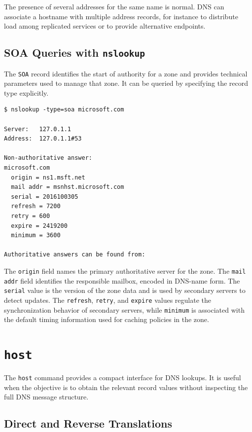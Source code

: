 \documentclass{scrbook}
\begin{document}
	The presence of several addresses for the same name is normal. DNS can associate a hostname with multiple address records, for instance to distribute load among replicated services or to provide alternative endpoints.
	
	\subsection{SOA Queries with \texttt{nslookup}}
	
	The \texttt{SOA} record identifies the start of authority for a zone and provides technical parameters used to manage that zone. It can be queried by specifying the record type explicitly.
	
	\begin{lstlisting}
$ nslookup -type=soa microsoft.com

Server:   127.0.1.1
Address:  127.0.1.1#53

Non-authoritative answer:
microsoft.com
  origin = ns1.msft.net
  mail addr = msnhst.microsoft.com
  serial = 2016100305
  refresh = 7200
  retry = 600
  expire = 2419200
  minimum = 3600

Authoritative answers can be found from:
	\end{lstlisting}
	
	The \texttt{origin} field names the primary authoritative server for the zone. The \texttt{mail addr} field identifies the responsible mailbox, encoded in DNS-name form. The \texttt{serial} value is the version of the zone data and is used by secondary servers to detect updates. The \texttt{refresh}, \texttt{retry}, and \texttt{expire} values regulate the synchronization behavior of secondary servers, while \texttt{minimum} is associated with the default timing information used for caching policies in the zone.
	
	\section{\texttt{host}}
	
	The \texttt{host} command provides a compact interface for DNS lookups. It is useful when the objective is to obtain the relevant record values without inspecting the full DNS message structure.
	
	\subsection{Direct and Reverse Translations}
	
\end{document}
